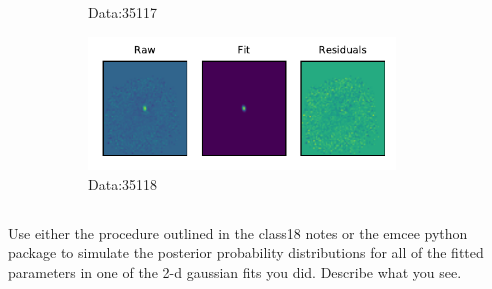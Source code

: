 \begin{figure}
\begin{subfigure}[b]{.49\textwidth}
        \caption{Data:35117}
        \label{fig:lmtFit7}
    \end{subfigure}
    \begin{subfigure}[b]{.49\textwidth}
        \centering
        \includegraphics[height=100pt]{CodeAndFigures/DataFits8.pdf}
        \caption{Data:35118}
        \label{fig:lmtFit8}
    \end{subfigure}
    \caption{}
    \label{}
\end{figure}


\subsection{}

Use either the procedure outlined in the class18 notes or the emcee
python package to simulate the posterior probability distributions for all of the fitted parameters
in one of the 2-d gaussian fits you did. Describe what you see.